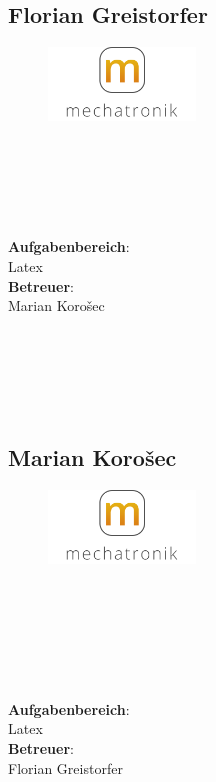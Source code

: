 \subsection*{Florian Greistorfer}
\begin{figure}
\begin{center}
  \includegraphics[width=0.35\textwidth]{logoMecha}
\end{center}
\end{figure}
\mbox{}\\
\mbox{}\\
\mbox{}\\
\mbox{}\\
\mbox{}\\
\textbf{Aufgabenbereich}:\\
Latex\\
\textbf{Betreuer}:\\
Marian Korošec
\mbox{}\\
\mbox{}\\
\mbox{}\\
\mbox{}\\
\mbox{}\\
\mbox{}\\

\subsection*{Marian Korošec}
\begin{figure}
\begin{center}
  \includegraphics[width=0.35\textwidth]{LogoMecha}
\end{center}
\end{figure}
\mbox{}\\
\mbox{}\\
\mbox{}\\
\mbox{}\\
\mbox{}\\
\mbox{}\\
\textbf{Aufgabenbereich}:\\
Latex\\
\textbf{Betreuer}:\\
Florian Greistorfer
\mbox{}\\
\mbox{}\\
\mbox{}\\
\mbox{}\\
\mbox{}\\
\newpage

